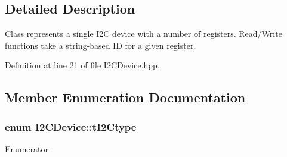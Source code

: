 \subsection{Detailed Description}
Class represents a single I2C device with a number of registers. Read/\+Write functions take a string-\/based ID for a given register. 

Definition at line 21 of file I2\+C\+Device.\+hpp.



\subsection{Member Enumeration Documentation}
\subsubsection[{\texorpdfstring{t\+I2\+Ctype}{tI2Ctype}}]{\setlength{\rightskip}{0pt plus 5cm}enum {\bf I2\+C\+Device\+::t\+I2\+Ctype}\hspace{0.3cm}{\ttfamily [strong]}}\hypertarget{class_i2_c_device_a275eefb9eb7dfd1ee0470a8bd0a73086}{}\label{class_i2_c_device_a275eefb9eb7dfd1ee0470a8bd0a73086}
\begin{Desc}
\item[Enumerator]\par
\begin{description}
\item[{\em 
S\+E\+MA\hypertarget{class_i2_c_device_a275eefb9eb7dfd1ee0470a8bd0a73086a6a7b9aebb5e9f27970de13799ad47f6e}{}\label{class_i2_c_device_a275eefb9eb7dfd1ee0470a8bd0a73086a6a7b9aebb5e9f27970de13799ad47f6e}
}]\item[{\em 
F\+T\+DI\hypertarget{class_i2_c_device_a275eefb9eb7dfd1ee0470a8bd0a73086a9a342381cd5923d1a59fdc8c22e286b7}{}\label{class_i2_c_device_a275eefb9eb7dfd1ee0470a8bd0a73086a9a342381cd5923d1a59fdc8c22e286b7}
}]\item[{\em 
P\+C\+Ie\hypertarget{class_i2_c_device_a275eefb9eb7dfd1ee0470a8bd0a73086a1fec00cf102e7c421f6662b56bd61fb7}{}\label{class_i2_c_device_a275eefb9eb7dfd1ee0470a8bd0a73086a1fec00cf102e7c421f6662b56bd61fb7}
}]\end{description}
\end{Desc}


